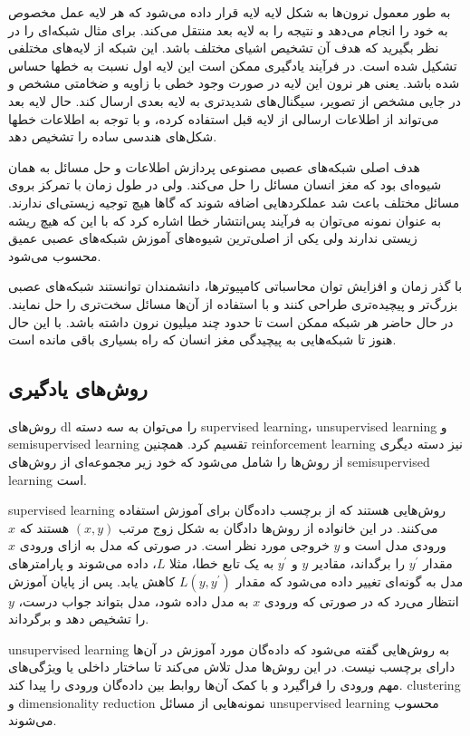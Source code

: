 به طور معمول نرون‌ها به شکل لایه لایه قرار داده می‌شود که هر لایه عمل مخصوص به
خود را انجام می‌دهد و نتیجه را به لایه بعد منتقل می‌کند. برای مثال شبکه‌ای را در
نظر بگیرید که هدف آن تشخیص اشیای مختلف باشد. این شبکه از لایه‌های مختلفی تشکیل
شده است. در فرآیند یادگیری ممکن است این لایه اول نسبت به خطها حساس شده باشد.
یعنی هر نرون این لایه در صورت وجود خطی با زاویه و ضخامتی مشخص و در جایی مشخص از
تصویر، سیگنال‌های شدیدتری به لایه بعدی ارسال کند. حال لایه بعد می‌تواند از
اطلاعات ارسالی از لایه قبل استفاده کرده، و با توجه به اطلاعات خطها شکل‌های هندسی
ساده را تشخیص دهد.

هدف اصلی شبکه‌های عصبی مصنوعی پردازش اطلاعات و حل مسائل به همان شیوه‌ای بود که
مغز انسان مسائل را حل می‌کند. ولی در طول زمان با تمرکز بروی مسائل مختلف باعث شد
عملکردهایی اضافه شوند که گاها هیچ توجیه زیستی‌ای ندارند. به عنوان نمونه می‌توان
به فرآیند پس‌انتشار خطا اشاره کرد که با این که هیچ ریشه زیستی ندارند ولی یکی از
اصلی‌ترین شیوه‌های آموزش شبکه‌های عصبی عمیق محسوب می‌شود.

با گذر زمان و افزایش توان محاسباتی کامپیوترها، دانشمندان توانستند شبکه‌های عصبی
بزرگ‌تر و پیچیده‌تری طراحی کنند و با استفاده از آن‌ها مسائل سخت‌تری را حل
نمایند. در حال حاضر هر شبکه ممکن است تا حدود چند میلیون نرون داشته باشد. با این
حال هنوز تا شبکه‌هایی به پیچیدگی مغز انسان که راه بسیاری باقی مانده است.

\subsection{روش‌های یادگیری}
روش‌های \gls{dl} را می‌توان به سه دسته \gls{supervised learning}،
\gls{unsupervised learning} و \gls{semisupervised learning} تقسیم کرد. همچنین
\gls{reinforcement learning} نیز دسته دیگری از روش‌ها را شامل می‌شود که خود زیر
مجموعه‌ای از روش‌های \gls{semisupervised learning} است.

\gls{supervised learning} روش‌هایی هستند که از برچسب داده‌گان برای آموزش استفاده
می‌کنند. در این خانواده از روش‌ها دادگان به شکل زوج مرتب $(x, y)$ هستند که $x$
ورودی مدل است و $y$ خروجی مورد نظر است. در صورتی که مدل به ازای ورودی $x$ مقدار
$y^{\prime}$ را برگداند، مقادیر $y$ و $y^\prime$ به یک تابع خطا، مثلا $L$، داده
می‌شوند و پارامترهای مدل به گونه‌ای تغییر داده می‌شود که مقدار $L(y, y^\prime)$
کاهش یابد. پس از پایان آموزش انتظار می‌رد که در صورتی که ورودی $x$ به مدل داده
شود، مدل بتواند جواب درست، $y$ را تشخیص دهد و برگرداند.

\gls{unsupervised learning} به روش‌هایی گفته می‌شود که داده‌گان مورد آموزش در
آن‌ها دارای برچسب نیست‌. در این روش‌ها مدل تلاش می‌کند تا ساختار داخلی یا
ویژگی‌های مهم ورودی را فراگیرد و با کمک آن‌ها روابط بین داده‌گان ورودی را
پیدا کند. \gls{clustering} و \gls{dimensionality reduction} نمونه‌هایی از مسائل
\gls{unsupervised learning} محسوب می‌شوند.

